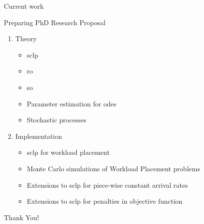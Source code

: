 \documentclass[pdf]{beamer}
\theoremstyle{definition}
\begin{document}
\begin{frame}{Current work}

    Preparing PhD Research Proposal

    \begin{enumerate}
        \item Theory

        \begin{itemize}
            \item \Gls{sclp}
            \item \Gls{ro}
            \item \Gls{so}
            \item Parameter estimation for \Glspl{ode}
            \item Stochastic processes
        \end{itemize}

        \item Implementation
        \begin{itemize}
            \item \Gls{sclp} for workload placement
            \item Monte Carlo simulations of Workload Placement problems
            \item Extensions to \gls{sclp} for piece-wise constant arrival rates
            \item Extensions to \gls{sclp} for penalties in objective function
        \end{itemize}

    \end{enumerate}

\end{frame}


\begin{frame}
    \centering \Huge Thank You!
\end{frame}
\end{document}
